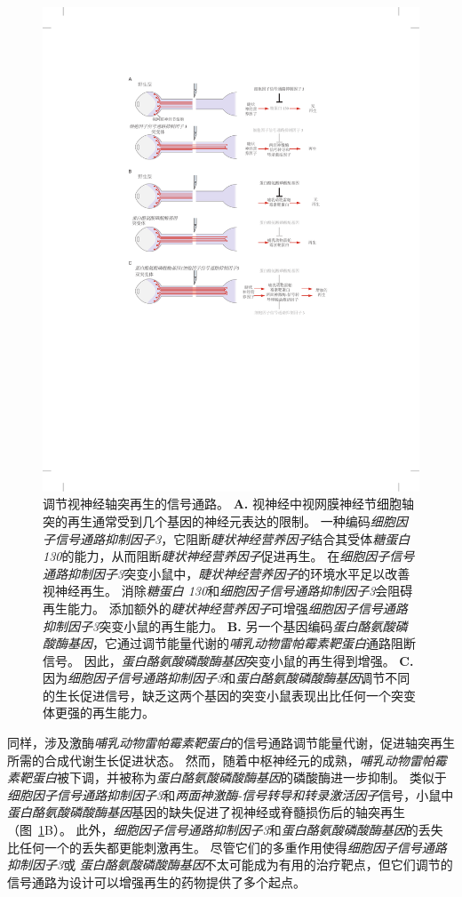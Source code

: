 \begin{figure}[htbp]
	\centering
	\includegraphics[width=0.75\linewidth]{chap50/fig_50_10}
	\caption{调节视神经轴突再生的信号通路。
		\textbf{A.} 视神经中视网膜神经节细胞轴突的再生通常受到几个基因的神经元表达的限制。
		一种编码\textit{细胞因子信号通路抑制因子3}，它阻断\textit{睫状神经营养因子}结合其受体\textit{糖蛋白 130}的能力，从而阻断\textit{睫状神经营养因子}促进再生。
		在\textit{细胞因子信号通路抑制因子3}突变小鼠中，\textit{睫状神经营养因子}的环境水平足以改善视神经再生。
		消除\textit{糖蛋白 130}和\textit{细胞因子信号通路抑制因子3}会阻碍再生能力。
		添加额外的\textit{睫状神经营养因子}可增强\textit{细胞因子信号通路抑制因子3}突变小鼠的再生能力。
		\textbf{B.} 另一个基因编码\textit{蛋白酪氨酸磷酸酶基因}，它通过调节能量代谢的\textit{哺乳动物雷帕霉素靶蛋白}通路阻断信号。
		因此，\textit{蛋白酪氨酸磷酸酶基因}突变小鼠的再生得到增强。
		\textbf{C.} 因为\textit{细胞因子信号通路抑制因子3}和\textit{蛋白酪氨酸磷酸酶基因}调节不同的生长促进信号，缺乏这两个基因的突变小鼠表现出比任何一个突变体更强的再生能力\cite{smith2009socs3}。}
	\label{fig:50_10}
\end{figure}


同样，涉及激酶\textit{哺乳动物雷帕霉素靶蛋白}的信号通路调节能量代谢，促进轴突再生所需的合成代谢生长促进状态。
然而，随着中枢神经元的成熟，\textit{哺乳动物雷帕霉素靶蛋白}被下调，并被称为\textit{蛋白酪氨酸磷酸酶基因}的磷酸酶进一步抑制。
类似于\textit{细胞因子信号通路抑制因子3}和\textit{两面神激酶-信号转导和转录激活因子}信号，小鼠中\textit{蛋白酪氨酸磷酸酶基因}基因的缺失促进了视神经或脊髓损伤后的轴突再生（图~\ref{fig:50_10}B）。
此外，\textit{细胞因子信号通路抑制因子3}和\textit{蛋白酪氨酸磷酸酶基因}的丢失比任何一个的丢失都更能刺激再生。
尽管它们的多重作用使得\textit{细胞因子信号通路抑制因子3}或 \textit{蛋白酪氨酸磷酸酶基因}不太可能成为有用的治疗靶点，但它们调节的信号通路为设计可以增强再生的药物提供了多个起点。



